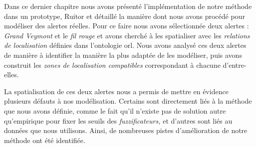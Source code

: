 Dans ce dernier chapitre nous avons présenté l'implémentation de notre
méthode dans un prototype, Ruitor et détaillé la manière dont nous
avons procédé pour modéliser des alertes réelles. Pour ce faire nous
avons sélectionnée deux alertes : \emph{Grand Veymont} et le \emph{fil
  rouge} et avons cherché à les spatialiser avec les \emph{relations
  de localisation} définies dans l'ontologie \ac{orl}. Nous avons
analysé ces deux alertes de manière à identifier la manière la plus
adaptée de les modéliser, puis avons construit les \emph{zones de
  localisation compatibles} correspondant à chacune d'entre-elles.

La spatialisation de ces deux alertes nous a permis de mettre en
évidence plusieurs défauts à nos modélisation. Certains sont
directement liés à la méthode que nous avons définie, comme le fait
qu'il n'existe pas de solution autre qu'empirique pour fixer les
seuils des \emph{fuzzificateurs,} et d'autres sont liés au données que
nous utilisons. Ainsi, de nombreuses pistes d'amélioration de notre
méthode ont été identifiée.

